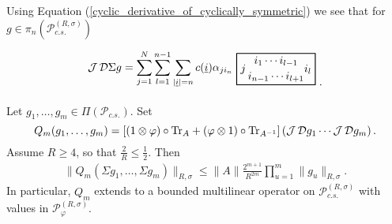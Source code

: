 Using Equation (\ref{cyclic_derivative_of_cyclically_symmetric}) we see that for $g\in\pi_n\left(\mathscr{P}_{c.s.}^{(R,\sigma)}\right)$
	\begin{align*}
	\begin{tikzpicture}[baseline]
	\node[left] at (0,0) {$\displaystyle\J\D\Sigma g=\sum_{j=1}^N \sum_{l=1}^{n-1}\sum_{|\ul{i}|=n} c(\ul{i}) \alpha_{ji_n}$};
	\draw[thick] (0,-.5) rectangle (2.5,.5);
	\node at (1.25,.25) {$i_1\cdots i_{l-1}$};
	\node at (1.25,-.25) {$i_{n-1}\cdots i_{l+1}$};
	\node[right] at (0,0) {$j$};
	\node[left] at (2.5,0) {$i_l$};
	\node[right] at (2.5,-.5) {.};
	\end{tikzpicture}
	\end{align*}

\begin{lem}
Let $g_1,\ldots, g_m\in \Pi\left(\mathscr{P}_{c.s.}\right)$. Set
	\begin{equation*}
		Q_m(g_1,\ldots,g_m)=\left[ (1\otimes\varphi)\circ\text{Tr}_A +(\varphi\otimes 1)\circ\text{Tr}_{A^{-1}}\right]\left( \operatorname{\mathcal J}\mathcal D g_1\cdots \operatorname{\mathcal J}\mathcal D g_m\right).
	\end{equation*}
Assume $R\geq4$, so that $\frac{2}{R}\leq\frac{1}{2}$. Then
	\begin{align*}
		\| Q_m(\Sigma g_1,\ldots, \Sigma g_m)\|_{R,\sigma} \leq \|A\|\frac{2^{m+1}}{R^{2m}} \prod_{u=1}^m \|g_u\|_{R,\sigma}.
	\end{align*}
In particular, $Q_m$ extends to a bounded multilinear operator on $\mathscr{P}^{(R,\sigma)}_{c.s.}$ with values in $\mathscr{P}^{(R,\sigma)}_{\varphi}$.
\end{lem}
